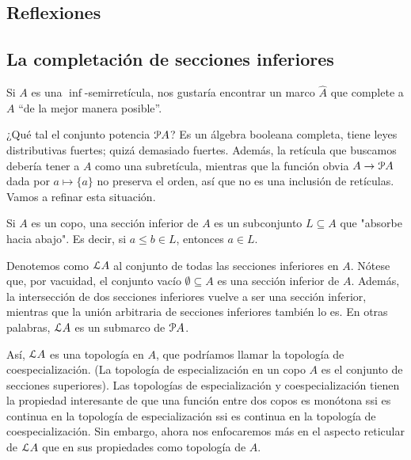 \subsection{Reflexiones}

\subsection{La completación de secciones inferiores}
Si $A$ es una $\inf$-semirretícula, nos gustaría encontrar un
marco $\hat A$ que complete a $A$ ``de la mejor manera posible''.

¿Qué tal el conjunto potencia $\cal PA$?
Es un álgebra booleana completa, tiene leyes distributivas
fuertes; quizá demasiado fuertes.
Además, la retícula que buscamos debería tener a $A$ como una
subretícula, mientras que
la función obvia $A\to\cal PA$ dada por $a\mapsto\{a\}$
no preserva el orden, así que no es una inclusión de
retículas.
Vamos a refinar esta situación.

Si $A$ es un copo, una sección inferior de $A$
es un subconjunto $L\subseteq A$ que "absorbe hacia abajo".
Es decir, si $a\leq b\in L$, entonces $a\in L$.

Denotemos como $\cal LA$ al conjunto de todas las secciones
inferiores en $A$.
Nótese que, por vacuidad, el conjunto vacío
$\emptyset\subseteq A$ es una sección inferior de $A$.
Además, la intersección de dos secciones
inferiores vuelve a ser una sección inferior, mientras que la
unión arbitraria de secciones inferiores también lo es.
En otras palabras, $\cal LA$ es un submarco de $\cal PA$.

Así, $\cal LA$ es una topología en $A$, que podríamos llamar la
topología de coespecialización. (La topología de especialización
en un copo $A$ es el conjunto de secciones superiores).
Las topologías de especialización y coespecialización tienen la
propiedad interesante de que una función entre dos copos es
monótona ssi es continua en la topología de
especialización ssi es continua en la topología de
coespecialización.
Sin embargo, ahora nos enfocaremos más en el aspecto reticular
de $\cal LA$ que en sus propiedades como topología de $A$.

